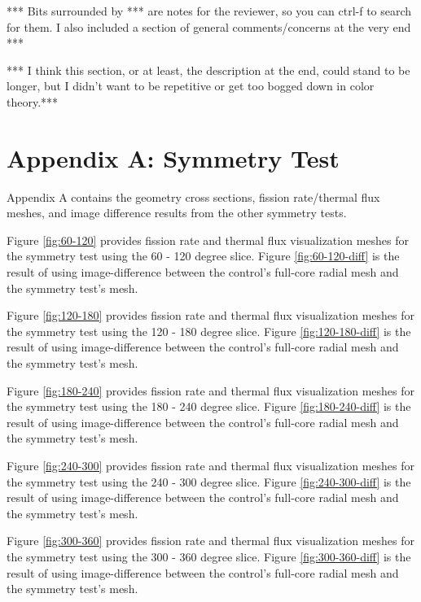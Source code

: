 *** Bits surrounded by *** are notes for the reviewer, so you can ctrl-f to search for them.  I also included a section of general comments/concerns at the very end ***

*** I think this section, or at least, the description at the end, could stand to be longer, but I didn't want to be repetitive or get too bogged down in color theory.***

\section{Appendix A: Symmetry Test}
Appendix A contains the geometry cross sections, fission rate/thermal flux meshes, and image difference results from the other symmetry tests.





Figure \ref{fig:60-120} provides fission rate and thermal flux visualization meshes for the symmetry test using the 60 - 120 degree slice.  Figure \ref{fig:60-120-diff} is the result of using image-difference between the control's full-core radial mesh and the symmetry test's mesh.




Figure \ref{fig:120-180} provides fission rate and thermal flux visualization meshes for the symmetry test using the 120 - 180 degree slice.  Figure \ref{fig:120-180-diff} is the result of using image-difference between the control's full-core radial mesh and the symmetry test's mesh.




Figure \ref{fig:180-240} provides fission rate and thermal flux visualization meshes for the symmetry test using the 180 - 240 degree slice.  Figure \ref{fig:180-240-diff} is the result of using image-difference between the control's full-core radial mesh and the symmetry test's mesh.




Figure \ref{fig:240-300} provides fission rate and thermal flux visualization meshes for the symmetry test using the 240 - 300 degree slice.  Figure \ref{fig:240-300-diff} is the result of using image-difference between the control's full-core radial mesh and the symmetry test's mesh.




Figure \ref{fig:300-360} provides fission rate and thermal flux visualization meshes for the symmetry test using the 300 - 360 degree slice.  Figure \ref{fig:300-360-diff} is the result of using image-difference between the control's full-core radial mesh and the symmetry test's mesh.

